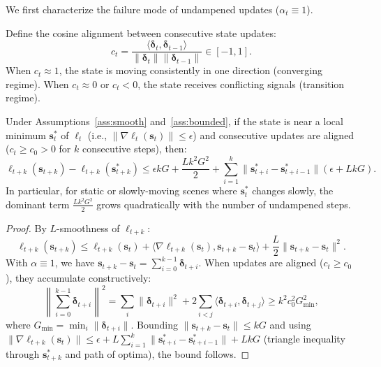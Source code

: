 We first characterize the failure mode of undampened updates ($\alpha_t \equiv 1$).

\begin{definition}
Define the cosine alignment between consecutive state updates:
\begin{equation}
    c_t = \frac{\langle \boldsymbol{\delta}_t, \boldsymbol{\delta}_{t-1} \rangle}{\|\boldsymbol{\delta}_t\| \|\boldsymbol{\delta}_{t-1}\|} \in [-1, 1].
\end{equation}
When $c_t \approx 1$, the state is moving consistently in one direction (converging regime). When $c_t \approx 0$ or $c_t < 0$, the state receives conflicting signals (transition regime).
\end{definition}

\begin{proposition}
\label{prop:overupdate}
Under Assumptions~\ref{ass:smooth} and~\ref{ass:bounded}, if the state is near a local minimum $\mathbf{s}^*_t$ of $\ell_t$ (i.e., $\|\nabla \ell_t(\mathbf{s}_t)\| \leq \epsilon$) and consecutive updates are aligned ($c_t \geq c_0 > 0$ for $k$ consecutive steps), then:
\begin{equation}
    \ell_{t+k}(\mathbf{s}_{t+k}) - \ell_{t+k}(\mathbf{s}^*_{t+k}) \leq \epsilon k G + \frac{L k^2 G^2}{2} + \sum_{i=1}^{k} \|\mathbf{s}^*_{t+i} - \mathbf{s}^*_{t+i-1}\|(\epsilon + LkG).
\end{equation}
In particular, for static or slowly-moving scenes where $\mathbf{s}^*_t$ changes slowly, the dominant term $\frac{L k^2 G^2}{2}$ grows quadratically with the number of undampened steps.
\end{proposition}

\begin{proof}
By $L$-smoothness of $\ell_{t+k}$:
\begin{equation}
    \ell_{t+k}(\mathbf{s}_{t+k}) \leq \ell_{t+k}(\mathbf{s}_t) + \langle \nabla \ell_{t+k}(\mathbf{s}_t), \mathbf{s}_{t+k} - \mathbf{s}_t \rangle + \frac{L}{2}\|\mathbf{s}_{t+k} - \mathbf{s}_t\|^2.
\end{equation}
With $\alpha \equiv 1$, we have $\mathbf{s}_{t+k} - \mathbf{s}_t = \sum_{i=0}^{k-1} \boldsymbol{\delta}_{t+i}$. When updates are aligned ($c_t \geq c_0$), they accumulate constructively:
\begin{equation}
    \left\|\sum_{i=0}^{k-1} \boldsymbol{\delta}_{t+i}\right\|^2 = \sum_i \|\boldsymbol{\delta}_{t+i}\|^2 + 2\sum_{i<j} \langle \boldsymbol{\delta}_{t+i}, \boldsymbol{\delta}_{t+j} \rangle \geq k^2 c_0^2 G_{\min}^2,
\end{equation}
where $G_{\min} = \min_i \|\boldsymbol{\delta}_{t+i}\|$. Bounding $\|\mathbf{s}_{t+k} - \mathbf{s}_t\| \leq kG$ and using $\|\nabla \ell_{t+k}(\mathbf{s}_t)\| \leq \epsilon + L\sum_{i=1}^{k}\|\mathbf{s}^*_{t+i} - \mathbf{s}^*_{t+i-1}\| + LkG$ (triangle inequality through $\mathbf{s}^*_{t+k}$ and path of optima), the bound follows.
\end{proof}

